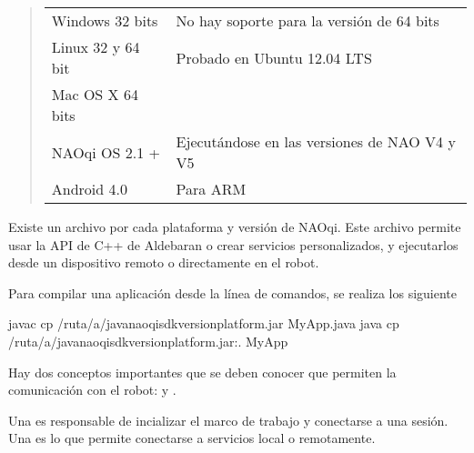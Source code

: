 \begin{quote}

\begin{savenotes}\sphinxattablestart
\centering
{}
\sphinxaftercaption

\begin{tabulary}{\linewidth}[t]{|T|T|}
\hline
{}\relax &\relax \\
\hline
Windows 32 bits
&
No hay soporte para la versión de 64 bits
\\
\hline
Linux 32 y 64 bit
&
Probado en Ubuntu 12.04 LTS
\\
\hline
Mac OS X 64 bits
&\\
\hline
NAOqi OS 2.1 +
&
Ejecutándose en las versiones de NAO V4 y V5
\\
\hline
Android 4.0
&
Para ARM
\\
\hline
\end{tabulary}
\par
\sphinxattableend\end{savenotes}
\end{quote}

Existe un archivo  por cada plataforma y versión de NAOqi. Este
archivo  permite usar la API de C++ de Aldebaran o crear servicios
personalizados, y ejecutarlos desde un dispositivo remoto o directamente en el
robot.

Para compilar una aplicación desde la línea de comandos, se realiza los
siguiente

\begin{sphinxVerbatim}[commandchars=\\\{\}]
javac \PYGZhy{}cp /ruta/a/java\PYGZhy{}naoqi\PYGZhy{}sdk\PYGZhy{}\PYGZlt{}version\PYGZgt{}\PYGZhy{}\PYGZlt{}platform\PYGZgt{}.jar MyApp.java
java \PYGZhy{}cp /ruta/a/java\PYGZhy{}naoqi\PYGZhy{}sdk\PYGZhy{}\PYGZlt{}version\PYGZgt{}\PYGZhy{}\PYGZlt{}platform\PYGZgt{}.jar:. MyApp
\end{sphinxVerbatim}

Hay dos conceptos importantes que se deben conocer que permiten la comunicación
con el robot:  y .

Una  es responsable de incializar el marco de trabajo
y conectarse a una sesión. Una  es lo que permite conectarse a
servicios local o remotamente.

